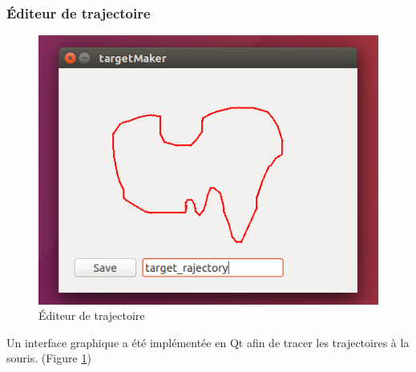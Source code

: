 \subsubsection{Éditeur de trajectoire}
\begin{figure}
 \centering
 \includegraphics[scale=0.6]{../figures/targettrajectory.png}
 \caption{Éditeur de trajectoire}
 \label{fig:targettrajectory}
\end{figure}
Un interface graphique a été implémentée en Qt afin de tracer les trajectoires à la souris. (Figure \ref{fig:targettrajectory})

